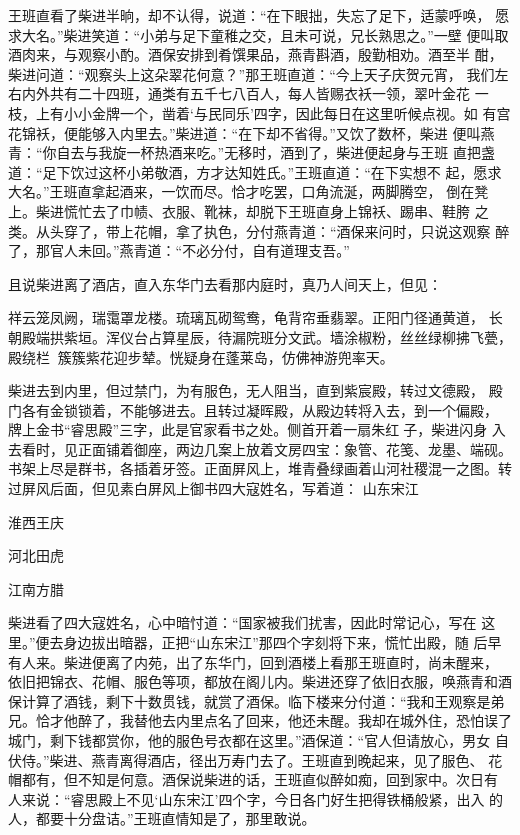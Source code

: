 王班直看了柴进半晌，却不认得，说道：“在下眼拙，失忘了足下，适蒙呼唤，
愿求大名。”柴进笑道：“小弟与足下童稚之交，且未可说，兄长熟思之。”一壁
便叫取酒肉来，与观察小酌。酒保安排到肴馔果品，燕青斟酒，殷勤相劝。酒至半
酣，柴进问道：“观察头上这朵翠花何意？”那王班直道：“今上天子庆贺元宵，
我们左右内外共有二十四班，通类有五千七八百人，每人皆赐衣袄一领，翠叶金花
一枝，上有小小金牌一个，凿着‘与民同乐’四字，因此每日在这里听候点视。如
有宫花锦袄，便能够入内里去。”柴进道：“在下却不省得。”又饮了数杯，柴进
便叫燕青：“你自去与我旋一杯热酒来吃。”无移时，酒到了，柴进便起身与王班
直把盏道：“足下饮过这杯小弟敬酒，方才达知姓氏。”王班直道：“在下实想不
起，愿求大名。”王班直拿起酒来，一饮而尽。恰才吃罢，口角流涎，两脚腾空，
倒在凳上。柴进慌忙去了巾帻、衣服、靴袜，却脱下王班直身上锦袄、踢串、鞋胯
之类。从头穿了，带上花帽，拿了执色，分付燕青道：“酒保来问时，只说这观察
醉了，那官人未回。”燕青道：“不必分付，自有道理支吾。”

且说柴进离了酒店，直入东华门去看那内庭时，真乃人间天上，但见：

祥云笼凤阙，瑞霭罩龙楼。琉璃瓦砌鸳鸯，龟背帘垂翡翠。正阳门径通黄道，
长朝殿端拱紫垣。浑仪台占算星辰，待漏院班分文武。墙涂椒粉，丝丝绿柳拂飞甍，
殿绕栏，簇簇紫花迎步辇。恍疑身在蓬莱岛，仿佛神游兜率天。

柴进去到内里，但过禁门，为有服色，无人阻当，直到紫宸殿，转过文德殿，
殿门各有金锁锁着，不能够进去。且转过凝晖殿，从殿边转将入去，到一个偏殿，
牌上金书“睿思殿”三字，此是官家看书之处。侧首开着一扇朱红子，柴进闪身
入去看时，见正面铺着御座，两边几案上放着文房四宝：象管、花笺、龙墨、端砚。
书架上尽是群书，各插着牙签。正面屏风上，堆青叠绿画着山河社稷混一之图。转
过屏风后面，但见素白屏风上御书四大寇姓名，写着道：
山东宋江

淮西王庆

河北田虎

江南方腊

柴进看了四大寇姓名，心中暗忖道：“国家被我们扰害，因此时常记心，写在
这里。”便去身边拔出暗器，正把“山东宋江”那四个字刻将下来，慌忙出殿，随
后早有人来。柴进便离了内苑，出了东华门，回到酒楼上看那王班直时，尚未醒来，
依旧把锦衣、花帽、服色等项，都放在阁儿内。柴进还穿了依旧衣服，唤燕青和酒
保计算了酒钱，剩下十数贯钱，就赏了酒保。临下楼来分付道：“我和王观察是弟
兄。恰才他醉了，我替他去内里点名了回来，他还未醒。我却在城外住，恐怕误了
城门，剩下钱都赏你，他的服色号衣都在这里。”酒保道：“官人但请放心，男女
自伏侍。”柴进、燕青离得酒店，径出万寿门去了。王班直到晚起来，见了服色、
花帽都有，但不知是何意。酒保说柴进的话，王班直似醉如痴，回到家中。次日有
人来说：“睿思殿上不见‘山东宋江’四个字，今日各门好生把得铁桶般紧，出入
的人，都要十分盘诘。”王班直情知是了，那里敢说。

